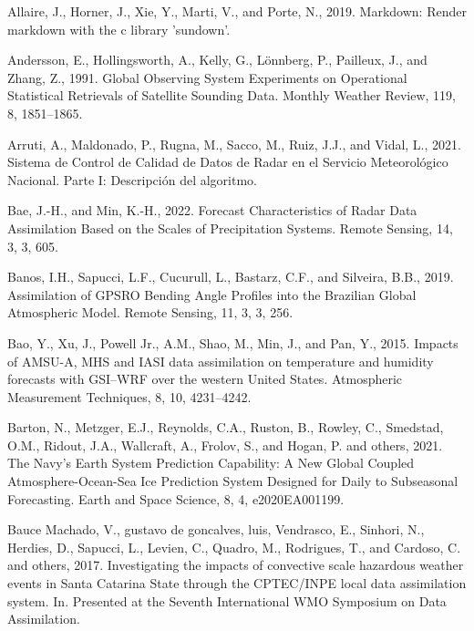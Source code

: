 \documentclass[12pt,oneside,a4paper]{reedthesis}
\begin{document}
\leavevmode\hypertarget{ref-allaire2019}{}%
Allaire, J., Horner, J., Xie, Y., Marti, V., and Porte, N., 2019. Markdown: Render markdown with the c library 'sundown'.

\leavevmode\hypertarget{ref-andersson1991}{}%
Andersson, E., Hollingsworth, A., Kelly, G., Lönnberg, P., Pailleux, J., and Zhang, Z., 1991. Global Observing System Experiments on Operational Statistical Retrievals of Satellite Sounding Data. Monthly Weather Review, 119, 8, 1851--1865.

\leavevmode\hypertarget{ref-arruti2021}{}%
Arruti, A., Maldonado, P., Rugna, M., Sacco, M., Ruiz, J.J., and Vidal, L., 2021. Sistema de Control de Calidad de Datos de Radar en el Servicio Meteorológico Nacional. Parte I: Descripción del algoritmo.

\leavevmode\hypertarget{ref-bae2022}{}%
Bae, J.-H., and Min, K.-H., 2022. Forecast Characteristics of Radar Data Assimilation Based on the Scales of Precipitation Systems. Remote Sensing, 14, 3, 3, 605.

\leavevmode\hypertarget{ref-banos2019}{}%
Banos, I.H., Sapucci, L.F., Cucurull, L., Bastarz, C.F., and Silveira, B.B., 2019. Assimilation of GPSRO Bending Angle Profiles into the Brazilian Global Atmospheric Model. Remote Sensing, 11, 3, 3, 256.

\leavevmode\hypertarget{ref-bao2015}{}%
Bao, Y., Xu, J., Powell Jr., A.M., Shao, M., Min, J., and Pan, Y., 2015. Impacts of AMSU-A, MHS and IASI data assimilation on temperature and humidity forecasts with GSI--WRF over the western United States. Atmospheric Measurement Techniques, 8, 10, 4231--4242.

\leavevmode\hypertarget{ref-barton2021}{}%
Barton, N., Metzger, E.J., Reynolds, C.A., Ruston, B., Rowley, C., Smedstad, O.M., Ridout, J.A., Wallcraft, A., Frolov, S., and Hogan, P. and others, 2021. The Navy's Earth System Prediction Capability: A New Global Coupled Atmosphere-Ocean-Sea Ice Prediction System Designed for Daily to Subseasonal Forecasting. Earth and Space Science, 8, 4, e2020EA001199.

\leavevmode\hypertarget{ref-baucemachado2017}{}%
Bauce Machado, V., gustavo de goncalves, luis, Vendrasco, E., Sinhori, N., Herdies, D., Sapucci, L., Levien, C., Quadro, M., Rodrigues, T., and Cardoso, C. and others, 2017. Investigating the impacts of convective scale hazardous weather events in Santa Catarina State through the CPTEC/INPE local data assimilation system. In. Presented at the Seventh International WMO Symposium on Data Assimilation.
\end{document}
